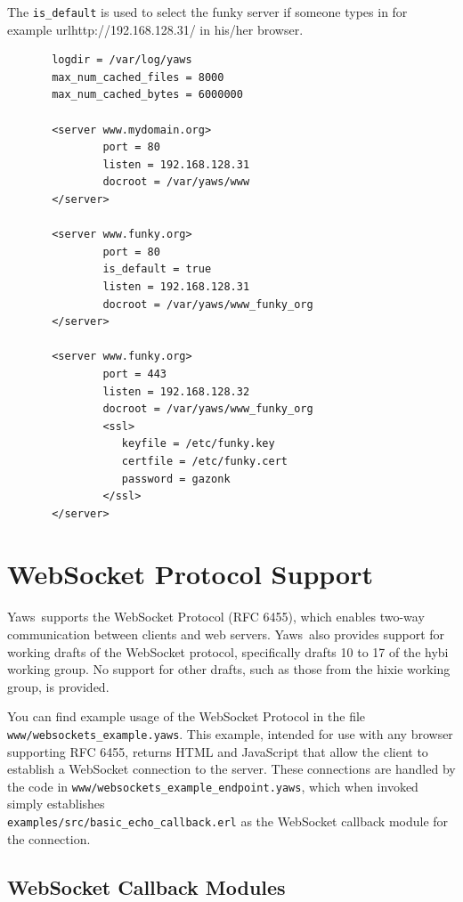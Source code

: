 \documentclass[11pt,oneside,english]{book}
\newcommand{\Yaws}            %
        {{\sc Yaws}}
\begin{document}
       The \verb+is_default+ is used to select the funky server if
       someone types in for example url{http://192.168.128.31/} in
       his\slash her browser.


\begin{verbatim}
       logdir = /var/log/yaws
       max_num_cached_files = 8000
       max_num_cached_bytes = 6000000

       <server www.mydomain.org>
               port = 80
               listen = 192.168.128.31
               docroot = /var/yaws/www
       </server>

       <server www.funky.org>
               port = 80
               is_default = true
               listen = 192.168.128.31
               docroot = /var/yaws/www_funky_org
       </server>

       <server www.funky.org>
               port = 443
               listen = 192.168.128.32
               docroot = /var/yaws/www_funky_org
               <ssl>
                  keyfile = /etc/funky.key
                  certfile = /etc/funky.cert
                  password = gazonk
               </ssl>
       </server>
\end{verbatim}

\chapter{WebSocket Protocol Support}
\label{websockets}

\Yaws\ supports the WebSocket Protocol (RFC 6455), which enables
two-way communication between clients and web servers. \Yaws\ also
provides support for working drafts of the WebSocket protocol,
specifically drafts 10 to 17 of the hybi working group. No support for
other drafts, such as those from the hixie working group, is provided.

You can find example usage of the WebSocket Protocol in the file
\verb+www/websockets_example.yaws+. This example, intended for use
with any browser supporting RFC 6455, returns HTML and JavaScript that
allow the client to establish a WebSocket connection to the
server. These connections are handled by the code in
\verb+www/websockets_example_endpoint.yaws+, which when invoked simply
establishes \\ \verb+examples/src/basic_echo_callback.erl+ as the
WebSocket callback module for the connection.

\section{WebSocket Callback Modules}
\end{document}
